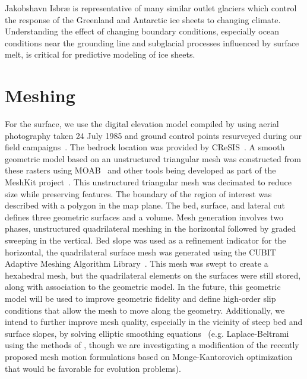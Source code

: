 Jakobshavn Isbr{\ae} is representative of many similar outlet glaciers which control the response of the Greenland and Antarctic ice sheets to changing climate.
Understanding the effect of changing boundary conditions, especially ocean conditions near the grounding line and subglacial processes influenced by surface melt, is critical for predictive modeling of ice sheets.


\section{Meshing}
For the surface, we use the digital elevation model compiled by \citet{motyka2010volume} using aerial photography taken 24 July 1985 and ground control points resurveyed during our field campaigns~.
The bedrock location was provided by CReSIS~\cite{plummer2011highres}.
A smooth geometric model based on an unstructured triangular mesh was constructed from these rasters using MOAB~\citep{moab} and other tools being developed as part of the MeshKit project~\citep{meshkit}.
This unstructured triangular mesh was decimated to reduce size while preserving features.
The boundary of the region of interest was described with a polygon in the map plane.
The bed, surface, and lateral cut defines three geometric surfaces and a volume.
Mesh generation involves two phases, unstructured quadrilateral meshing in the horizontal followed by graded sweeping in the vertical.
Bed slope was used as a refinement indicator for the horizontal, the quadrilateral surface mesh was generated using the CUBIT Adaptive Meshing Algorithm Library~\citep{blacker1994cmg}.
This mesh was swept to create a hexahedral mesh, but the quadrilateral elements on the surfaces were still stored, along with association to the geometric model.
In the future, this geometric model will be used to improve geometric fidelity and define high-order slip conditions that allow the mesh to move along the geometry.
Additionally, we intend to further improve mesh quality, especially in the vicinity of steep bed and surface slopes, by solving elliptic smoothing equations~\citep{liseikin2009grid} (e.g. Laplace-Beltrami using the methods of \citet{hansen2007unstructured,berndt2008efficient}, though we are investigating a modification of the recently proposed mesh motion formulations based on Monge-Kantorovich optimization~\citet{delzanno2008optimal,chacon2011robust} that would be favorable for evolution problems).

